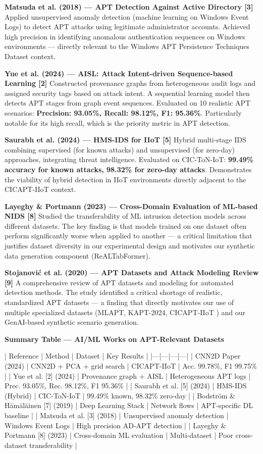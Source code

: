 \textbf{Matsuda et al. (2018) — APT Detection Against Active Directory [3]}  
Applied unsupervised anomaly detection (machine learning on Windows Event Logs) to detect APT attacks using legitimate administrator accounts. Achieved high precision in identifying anomalous authentication sequences on Windows environments — directly relevant to the Windows APT Persistence Techniques Dataset context.

\textbf{Yue et al. (2024) — AISL: Attack Intent-driven Sequence-based Learning [2]}  
Constructed provenance graphs from heterogeneous audit logs and assigned security tags based on attack intent. A sequential learning model then detects APT stages from graph event sequences. Evaluated on 10 realistic APT scenarios: \textbf{Precision: 93.05\%, Recall: 98.12\%, F1: 95.36\%}. Particularly notable for its high recall, which is the priority metric in APT detection.

\textbf{Saurabh et al. (2024) — HMS-IDS for IIoT [5]}  
Hybrid multi-stage IDS combining supervised (for known attacks) and unsupervised (for zero-day) approaches, integrating threat intelligence. Evaluated on CIC-ToN-IoT: \textbf{99.49\% accuracy for known attacks, 98.32\% for zero-day attacks}. Demonstrates the viability of hybrid detection in IIoT environments directly adjacent to the CICAPT-IIoT \cite{ghiasvand2024cicapt} context.

\textbf{Layeghy \& Portmann (2023) — Cross-Domain Evaluation of ML-based NIDS [8]}  
Studied the transferability of ML intrusion detection models across different datasets. The key finding is that models trained on one dataset often perform significantly worse when applied to another — a critical limitation that justifies dataset diversity in our experimental design and motivates our synthetic data generation component (ReALTabFormer).

\textbf{Stojanović et al. (2020) — APT Datasets and Attack Modeling Review [9]}  
A comprehensive review of APT datasets and modeling for automated detection methods. The study identified a critical shortage of realistic, standardized APT datasets — a finding that directly motivates our use of multiple specialized datasets (MLAPT, KAPT-2024, CICAPT-IIoT \cite{ghiasvand2024cicapt}) and our GenAI-based synthetic scenario generation.

\textbf{Summary Table — AI/ML Works on APT-Relevant Datasets}

| Reference | Method | Dataset | Key Results |
|---|---|---|---|
| CNN2D Paper (2024) | CNN2D + PCA + grid search | CICAPT-IIoT \cite{ghiasvand2024cicapt} | Acc. 99.78\%, F1 99.75\% |
| Yue et al. [2] (2024) | Provenance graph + AISL | Heterogeneous APT logs | Prec. 93.05\%, Rec. 98.12\%, F1 95.36\% |
| Saurabh et al. [5] (2024) | HMS-IDS (Hybrid) | CIC-ToN-IoT | 99.49\% known, 98.32\% zero-day |
| Bodström \& Hämäläinen [7] (2019) | Deep Learning Stack | Network flows | APT-specific DL baseline |
| Matsuda et al. [3] (2018) | Unsupervised anomaly detection | Windows Event Logs | High precision AD-APT detection |
| Layeghy \& Portmann [8] (2023) | Cross-domain ML evaluation | Multi-dataset | Poor cross-dataset transferability |

